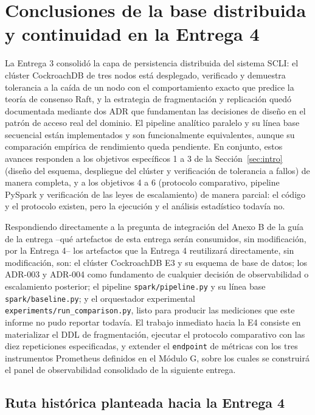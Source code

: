 \documentclass[10pt,twocolumn]{article}
\begin{document}
\section{Conclusiones de la base distribuida y continuidad en la Entrega 4}
\label{sec:conclusiones}

La Entrega 3 consolidó la capa de persistencia distribuida del sistema
SCLI: el clúster CockroachDB de tres nodos está desplegado, verificado y
demuestra tolerancia a la caída de un nodo con el comportamiento exacto que
predice la teoría de consenso Raft, y la estrategia de fragmentación y
replicación quedó documentada mediante dos ADR que fundamentan las
decisiones de diseño en el patrón de acceso real del dominio. El pipeline
analítico paralelo y su línea base secuencial están implementados y son
funcionalmente equivalentes, aunque su comparación empírica de rendimiento
queda pendiente. En conjunto, estos avances responden a los objetivos
específicos 1 a 3 de la Sección~\ref{sec:intro} (diseño del esquema,
despliegue del clúster y verificación de tolerancia a fallos) de manera
completa, y a los objetivos 4 a 6 (protocolo comparativo, pipeline PySpark
y verificación de las leyes de escalamiento) de manera parcial: el código
y el protocolo existen, pero la ejecución y el análisis estadístico
todavía no.

Respondiendo directamente a la pregunta de integración del Anexo B de la
guía de la entrega --qué artefactos de esta entrega serán consumidos, sin
modificación, por la Entrega 4-- los artefactos que la Entrega 4
reutilizará directamente, sin modificación, son: el clúster CockroachDB E3
y su esquema de base de datos;
los ADR-003 y ADR-004 como fundamento de cualquier decisión de observabilidad
o escalamiento posterior; el pipeline \texttt{spark/pipeline.py} y su línea
base \texttt{spark/baseline.py}; y el orquestador experimental
\texttt{experiments/run\_comparison.py}, listo para producir las mediciones
que este informe no pudo reportar todavía. El trabajo inmediato hacia la
E4 consiste en materializar el DDL de fragmentación, ejecutar el protocolo
comparativo con las diez repeticiones especificadas, y extender el
\texttt{endpoint} de métricas con los tres instrumentos Prometheus
definidos en el Módulo G, sobre los cuales se construirá el panel de
observabilidad consolidado de la siguiente entrega.

\subsection{Ruta histórica planteada hacia la Entrega 4}
\end{document}
